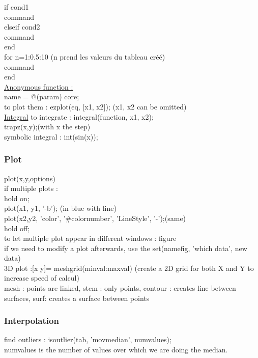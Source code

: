 \documentclass[../main.tex]{subfiles}
\begin{document}
if cond1\\
\quad command\\
elseif cond2\\
\quad command\\
end\\

for n=1:0.5:10 (n prend les valeurs du tableau créé)\\
\quad command\\
end\\

\quad \underline{Anonymous function :}\\
name = @(param) core;\\
to plot them : ezplot(eq, [x1, x2]); (x1, x2 can be omitted)\\

\quad \underline{Integral}
to integrate : integral(function, x1, x2);\\
trapz(x,y);(with x the step)\\
symbolic integral : int(sin(x));\\



\subsubsection{Plot}
plot(x,y,options)\\

if multiple plots : \\
hold on;\\
plot(x1, y1, '-b'); (in blue with line)\\
plot(x2,y2, 'color', '\#colornumber', 'LineStyle', '-');(same)\\
hold off;\\

to let multiple plot appear in different windows : figure\\
if we need to modify a plot afterwards, use the set(namefig, 'which data', new data)\\

3D plot :[x y]= meshgrid(minval:maxval) (create a 2D grid for both X and Y to increase speed of calcul)\\
mesh : points are linked, stem : only points, contour : creates line between surfaces, surf: creates a surface between points\\

\subsubsection{Interpolation}
find outliers : isoutlier(tab, 'movmedian', numvalues);\\
numvalues is the number of values over which we are doing the median.\\
\end{document}
